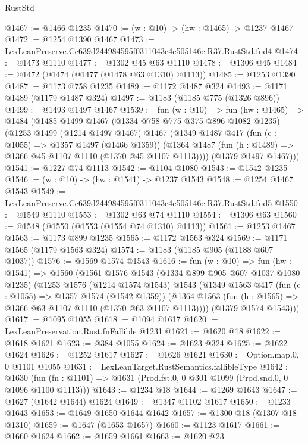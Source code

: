 \begin{lexlean}{RustStd}
\begin{coremodule}
@1467 := @1466 @1235
@1470 := (w : @10) -> (hw : @1465) -> @1237 @1467
@1472 := @1254 @1390 @1467
@1473 := LexLeanPreserve.Cc639d244984595f0311043c4c505146e.R37.RustStd.fnd4
@1474 := @1473 @1110
@1477 := @1302 @45 @63 @1110
@1478 := @1306 @45
@1484 := @1472 (@1474 (@1477 (@1478 @63 @1310) @1113))
@1485 := @1253 @1390
@1487 := @1173 @758 @1235
@1489 := @1172 @1487 @324
@1493 := @1171 @1489 (@1179 @1487 @324)
@1497 := @1183 (@1185 @775 (@1326 @896))
@1499 := @1493 @1497 @1467
@1539 := fun (w : @10) =>
  fun (hw : @1465) =>
  @1484
    (@1485
      @1499
      @1467
      (@1334 @758 @775 @375 @896 @1082 @1235)
      (@1253
        @1499
        (@1214 @1497 @1467)
        @1467
        (@1349
          @1487
          @417
          (fun (c : @1055) => @1357 @1497 (@1466 @1359))
          (@1364 @1487 (fun (h : @1489) => @1366 @45 @1107 @1110 (@1370 @45 @1107 @1113))))
        (@1379 @1497 @1467)))
@1541 := @1227 @74 @1113
@1542 := @1104 @1080
@1543 := @1542 @1235
@1546 := (w : @10) -> (hw : @1541) -> @1237 @1543
@1548 := @1254 @1467 @1543
@1549 := LexLeanPreserve.Cc639d244984595f0311043c4c505146e.R37.RustStd.fnd5
@1550 := @1549 @1110
@1553 := @1302 @63 @74 @1110
@1554 := @1306 @63
@1560 := @1548 (@1550 (@1553 (@1554 @74 @1310) @1113))
@1561 := @1253 @1467
@1563 := @1173 @899 @1235
@1565 := @1172 @1563 @324
@1569 := @1171 @1565 (@1179 @1563 @324)
@1574 := @1183 (@1185 @905 (@1188 @607 @1037))
@1576 := @1569 @1574 @1543
@1616 := fun (w : @10) =>
  fun (hw : @1541) =>
  @1560
    (@1561
      @1576
      @1543
      (@1334 @899 @905 @607 @1037 @1080 @1235)
      (@1253
        @1576
        (@1214 @1574 @1543)
        @1543
        (@1349
          @1563
          @417
          (fun (c : @1055) => @1357 @1574 (@1542 @1359))
          (@1364 @1563 (fun (h : @1565) => @1366 @63 @1107 @1110 (@1370 @63 @1107 @1113))))
        (@1379 @1574 @1543)))
@1617 := @1095 @1055
@1618 := @1094 @1617
@1620 := LexLeanPreservation.Rust.fnFallible @1231
@1621 := @1620 @18
@1622 := @1618 @1621
@1623 := @384 @1055
@1624 := @1623 @324
@1625 := @1622 @1624
@1626 := @1252 @1617
@1627 := @1626 @1621
@1630 := Option.map.{0, 0} @1101 @1055
@1631 := LexLeanTarget.RustSemantics.fallibleType
@1642 := @1630
    (fun (fn : @1101) => @1631 (Prod.fst.{0, 0} @301 @1099 (Prod.snd.{0, 0} @1096 @1100 @1113)))
@1643 := @1234 @18
@1644 := @1269 @1643
@1647 := @1627 (@1642 @1644) @1624
@1649 := @1347 @1102 @1617
@1650 := @1233 @1643
@1653 := @1649 @1650 @1644 @1642
@1657 := @1300 @18 (@1307 @18 @1310)
@1659 := @1647 (@1653 @1657)
@1660 := @1123 @1617
@1661 := @1660 @1624
@1662 := @1659 @1661
@1663 := @1620 @23

\end{coremodule}
\end{lexlean}
